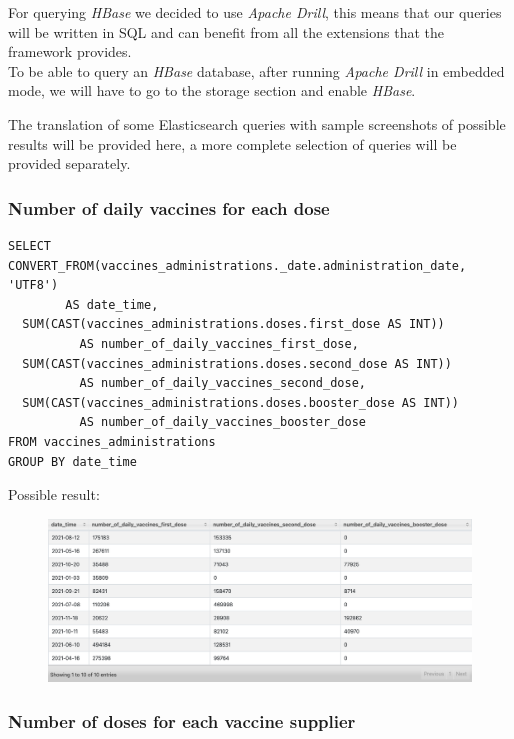 \documentclass[12pt, a4paper]{article}
\begin{document}
For querying \emph{HBase} we decided to use \emph{Apache Drill}, this means that our
queries will be written in SQL and can benefit from all the extensions that the 
framework provides. \\
To be able to query an \emph{HBase} database, after running \emph{Apache Drill} in 
embedded mode, we will have to go to the storage section and enable \emph{HBase}.  

\noindent
The translation of some Elasticsearch queries with sample screenshots of possible results
will be provided here, a more complete selection of queries will be provided separately.

\subsubsection{Number of daily vaccines for each dose}

\begin{tcolorbox}[fontupper=\scriptsize]
  \begin{verbatim}
SELECT CONVERT_FROM(vaccines_administrations._date.administration_date, 'UTF8') 
        AS date_time,
  SUM(CAST(vaccines_administrations.doses.first_dose AS INT)) 
          AS number_of_daily_vaccines_first_dose,
  SUM(CAST(vaccines_administrations.doses.second_dose AS INT)) 
          AS number_of_daily_vaccines_second_dose,
  SUM(CAST(vaccines_administrations.doses.booster_dose AS INT)) 
          AS number_of_daily_vaccines_booster_dose
FROM vaccines_administrations
GROUP BY date_time
  \end{verbatim}
\end{tcolorbox}

\noindent
Possible result:
\begin{figure}[ht]
  \centering
  \includegraphics[width=\linewidth]{hbase_query_1.png}
\end{figure}

\subsubsection{Number of doses for each vaccine supplier}
\end{document}
